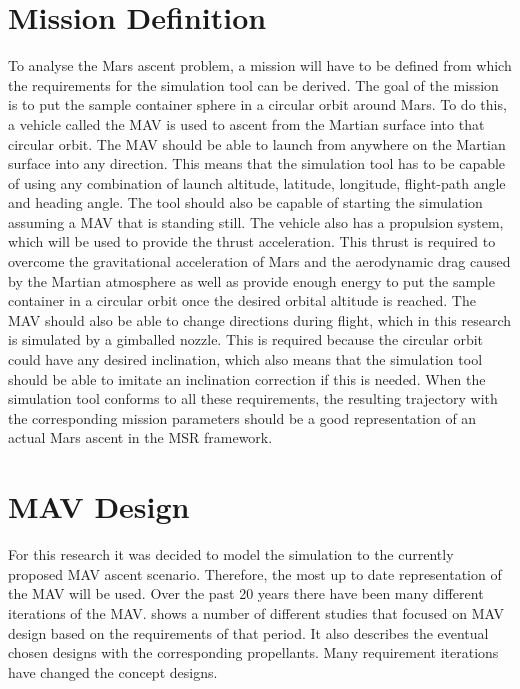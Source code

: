 \section{Mission Definition}
\label{sec:missionDefinition}
To analyse the Mars ascent problem, a mission will have to be defined from which the requirements for the simulation tool can be derived. The goal of the mission is to put the sample container sphere in a circular orbit around Mars. To do this, a vehicle called the \ac{MAV} is used to ascent from the Martian surface into that circular orbit. The \ac{MAV} should be able to launch from anywhere on the Martian surface into any direction. This means that the simulation tool has to be capable of using any combination of launch altitude, latitude, longitude, flight-path angle and heading angle. The tool should also be capable of starting the simulation assuming a \ac{MAV} that is standing still. The vehicle also has a propulsion system, which will be used to provide the thrust acceleration. This thrust is required to overcome the gravitational acceleration of Mars and the aerodynamic drag caused by the Martian atmosphere as well as provide enough energy to put the sample container in a circular orbit once the desired orbital altitude is reached. The \ac{MAV} should also be able to change directions during flight, which in this research is simulated by a gimballed nozzle. This is required because the circular orbit could have any desired inclination, which also means that the simulation tool should be able to imitate an inclination correction if this is needed. When the simulation tool conforms to all these requirements, the resulting trajectory with the corresponding mission parameters should be a good representation of an actual Mars ascent in the \ac{MSR} framework. 


\section{\ac{MAV} Design}
\label{sec:mavDesign}
For this research it was decided to model the simulation to the currently proposed \ac{MAV} ascent scenario. Therefore, the most up to date representation of the \ac{MAV} will be used. Over the past 20 years there have been many different iterations of the \ac{MAV}.  shows a number of different studies that focused on \ac{MAV} design based on the requirements of that period. It also describes the eventual chosen designs with the corresponding propellants. Many requirement iterations have changed the concept designs.

